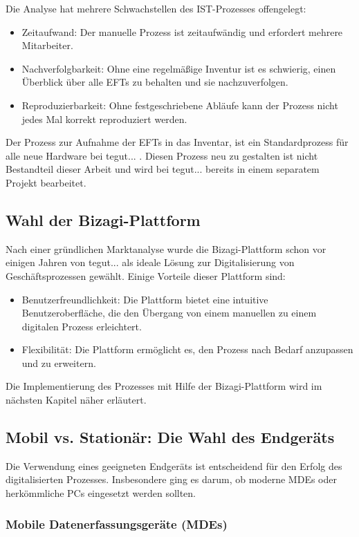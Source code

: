 \documentclass[12pt, a4paper]{article}
\begin{document}
Die Analyse hat mehrere Schwachstellen des IST-Prozesses offengelegt:
\begin{itemize}
\item Zeitaufwand: Der manuelle Prozess ist zeitaufwändig und erfordert mehrere Mitarbeiter.
\item Nachverfolgbarkeit: Ohne eine regelmäßige Inventur ist es schwierig, einen Überblick über alle EFTs zu behalten und sie nachzuverfolgen.
\item Reproduzierbarkeit: Ohne festgeschriebene Abläufe kann der Prozess nicht jedes Mal korrekt reproduziert werden.
\end{itemize}
Der Prozess zur Aufnahme der EFTs in das Inventar, ist ein Standardprozess für alle neue Hardware bei tegut... . Diesen Prozess neu zu gestalten ist nicht Bestandteil dieser
Arbeit und wird bei tegut... bereits in einem separatem Projekt bearbeitet.

\subsection{Wahl der Bizagi-Plattform}

Nach einer gründlichen Marktanalyse wurde die Bizagi-Plattform schon vor einigen Jahren von tegut... als ideale Lösung zur Digitalisierung von Geschäftsprozessen gewählt. 
Einige Vorteile dieser Plattform sind:
\begin{itemize}
\item Benutzerfreundlichkeit: Die Plattform bietet eine intuitive Benutzeroberfläche, die den Übergang von einem manuellen zu einem digitalen Prozess erleichtert.
\item Flexibilität: Die Plattform ermöglicht es, den Prozess nach Bedarf anzupassen und zu erweitern.
\end{itemize}
Die Implementierung des Prozesses mit Hilfe der Bizagi-Plattform wird im nächsten Kapitel näher erläutert.

\subsection{Mobil vs. Stationär: Die Wahl des Endgeräts}

Die Verwendung eines geeigneten Endgeräts ist entscheidend für den Erfolg des digitalisierten Prozesses. Insbesondere ging es darum, ob moderne MDEs oder herkömmliche PCs eingesetzt werden sollten.

\subsubsection{Mobile Datenerfassungsgeräte (MDEs)}
\end{document}
